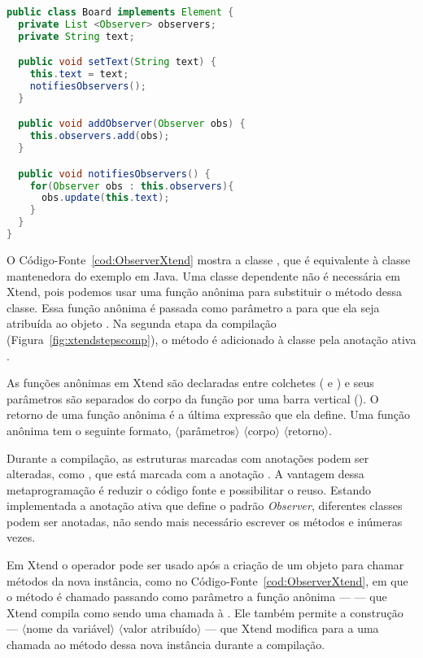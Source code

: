 \begin{lstlisting}[language=Java, caption={Exemplo de implementação da interface \textbf{Element}}, label={cod:ObservadorClassElementoJava}]
public class Board implements Element {
  private List <Observer> observers;
  private String text;

  public void setText(String text) {
    this.text = text;
    notifiesObservers();
  }

  public void addObserver(Observer obs) {
    this.observers.add(obs);
  }

  public void notifiesObservers() {
    for(Observer obs : this.observers){
      obs.update(this.text);
    }
  }
}
\end{lstlisting}

O Código-Fonte~\ref{cod:ObserverXtend} mostra a classe , que é equivalente à classe mantenedora do exemplo em Java. Uma classe dependente não é necessária em Xtend, pois podemos usar uma função anônima para substituir o método  dessa classe. Essa função anônima é passada como parâmetro a  para que ela seja atribuída ao objeto . Na segunda etapa da compilação (Figura~\ref{fig:xtendstepscomp}), o método  é adicionado à classe  pela anotação ativa .

As funções anônimas em Xtend são declaradas entre colchetes (\srcstyle{[} e \srcstyle{]}) e seus parâmetros são separados do corpo da função por uma barra vertical (\srcstyle{|}). O retorno de uma função anônima é a última expressão que ela define. Uma função anônima tem o seguinte formato, \srcstyle{[}  $\langle$parâmetros$\rangle$ \srcstyle{|}  $\langle$corpo$\rangle$  $\langle$retorno$\rangle$\srcstyle{]}.

Durante a compilação, as estruturas marcadas com anotações podem ser alteradas, como , que está marcada com a anotação . A vantagem dessa metaprogramação é reduzir o código fonte e possibilitar o reuso. Estando implementada a anotação ativa que define o padrão \textit{Observer}, diferentes classes podem ser anotadas, não sendo mais necessário escrever os métodos  e  inúmeras vezes.

Em Xtend o operador \srcstyle{=>} pode ser usado após a criação de um objeto para chamar métodos da nova instância, como no Código-Fonte~\ref{cod:ObserverXtend}, em que o método  é chamado passando como parâmetro a função anônima ---  --- que Xtend compila como sendo uma chamada à . Ele também permite a construção --- $\langle$nome da variável$\rangle$ \srcstyle{=} $\langle$valor atribuído$\rangle$ --- que Xtend modifica para a uma chamada ao método  dessa nova instância durante a compilação.

